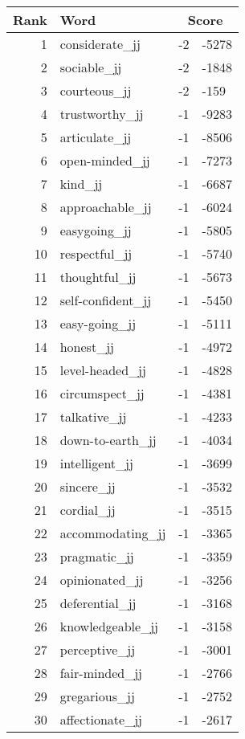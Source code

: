 \begin{longtable}[!htbp]{| rlr@{.}l |}
    \hline
    \textbf{Rank} & \textbf{Word} & \multicolumn{2}{c|}{\textbf{Score}} \\
    \hline
    \endhead
    1 & considerate\_jj & -2 & -5278 \\
    2 & sociable\_jj & -2 & -1848 \\
    3 & courteous\_jj & -2 & -159 \\
    4 & trustworthy\_jj & -1 & -9283 \\
    5 & articulate\_jj & -1 & -8506 \\
    6 & open-minded\_jj & -1 & -7273 \\
    7 & kind\_jj & -1 & -6687 \\
    8 & approachable\_jj & -1 & -6024 \\
    9 & easygoing\_jj & -1 & -5805 \\
    10 & respectful\_jj & -1 & -5740 \\
    11 & thoughtful\_jj & -1 & -5673 \\
    12 & self-confident\_jj & -1 & -5450 \\
    13 & easy-going\_jj & -1 & -5111 \\
    14 & honest\_jj & -1 & -4972 \\
    15 & level-headed\_jj & -1 & -4828 \\
    16 & circumspect\_jj & -1 & -4381 \\
    17 & talkative\_jj & -1 & -4233 \\
    18 & down-to-earth\_jj & -1 & -4034 \\
    19 & intelligent\_jj & -1 & -3699 \\
    20 & sincere\_jj & -1 & -3532 \\
    21 & cordial\_jj & -1 & -3515 \\
    22 & accommodating\_jj & -1 & -3365 \\
    23 & pragmatic\_jj & -1 & -3359 \\
    24 & opinionated\_jj & -1 & -3256 \\
    25 & deferential\_jj & -1 & -3168 \\
    26 & knowledgeable\_jj & -1 & -3158 \\
    27 & perceptive\_jj & -1 & -3001 \\
    28 & fair-minded\_jj & -1 & -2766 \\
    29 & gregarious\_jj & -1 & -2752 \\
    30 & affectionate\_jj & -1 & -2617 \\

\end{longtable}
